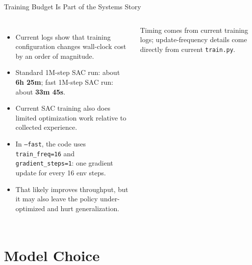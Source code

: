 \documentclass[10pt,aspectratio=169]{beamer}
\begin{document}
\begin{frame}{Training Budget Is Part of the Systems Story}
  \begin{columns}[T,onlytextwidth]
      \centering
      \begin{itemize}
        \item Current logs show that training configuration changes wall-clock cost by an order of magnitude.
        \item Standard 1M-step SAC run: about \textbf{6h 25m}; fast 1M-step SAC run: about \textbf{33m 45s}.
        \item Current SAC training also does limited optimization work relative to collected experience.
        \item In \texttt{--fast}, the code uses \texttt{train\_freq=16} and \texttt{gradient\_steps=1}: one gradient update for every 16 env steps.
        \item That likely improves throughput, but it may also leave the policy under-optimized and hurt generalization.
      \end{itemize}

      \vspace{0.4em}
      {\scriptsize Timing comes from current training logs; update-frequency details come directly from current \texttt{train.py}.}
  \end{columns}
\end{frame}

\section{Model Choice}
\end{document}
